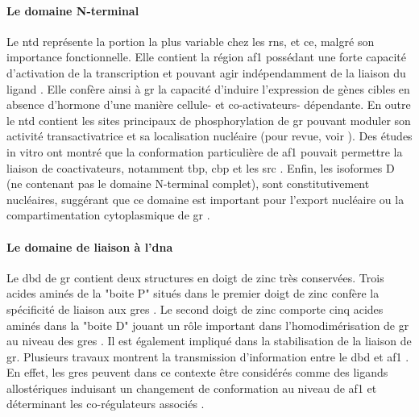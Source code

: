 \documentclass[../main.tex]{subfiles}
\begin{document}


\paragraph{Le domaine N-terminal}
Le \gls{ntd} représente la portion la plus variable chez les \glspl{rn}, et ce, malgré son importance fonctionnelle.
Elle contient la région \gls{af1} possédant une forte capacité d'activation de la transcription et pouvant agir indépendamment de la liaison du ligand \citep{Godowski1987}.
Elle confère ainsi à \gls{gr} la capacité d'induire l'expression de gènes cibles en absence d'hormone d'une manière cellule- et co-activateurs- dépendante.
En outre le \gls{ntd} contient les sites principaux de phosphorylation de \gls{gr} pouvant moduler son activité transactivatrice et sa localisation nucléaire (pour revue, voir \citealp{Galliher-Beckley2009}).
Des études in vitro ont montré que la conformation particulière de \gls{af1} pouvait permettre la liaison de coactivateurs, notamment \gls{tbp}, \gls{cbp} et les \gls{src} \citep{Kumar2005}.
Enfin, les isoformes D (ne contenant pas le domaine N-terminal complet), sont constitutivement nucléaires, suggérant que ce domaine est important pour l'export nucléaire ou la compartimentation cytoplasmique de \gls{gr} \citep{Lu2006}.

\paragraph{Le domaine de liaison à l'\gls{dna}}
Le \gls{dbd} de \gls{gr} contient deux structures en doigt de zinc très conservées.
Trois acides aminés de la "boite P" situés dans le premier doigt de zinc confère la spécificité de liaison aux \glspl{gre} \citep{Luisi1991}.
Le second doigt de zinc comporte cinq acides aminés dans la "boite D" jouant un rôle important dans l'homodimérisation de \gls{gr} au niveau des \glspl{gre} \citep{Luisi1991}.
Il est également impliqué dans la stabilisation de la liaison de \gls{gr}.
Plusieurs travaux montrent la transmission d'information entre le \gls{dbd} et \gls{af1} \citep{Kumar1999}.
En effet, les \glspl{gre} peuvent dans ce contexte être considérés comme des ligands allostériques induisant un changement de conformation au niveau de \gls{af1} et déterminant les co-régulateurs associés \citep{Lefstin1998}.
\end{document}
